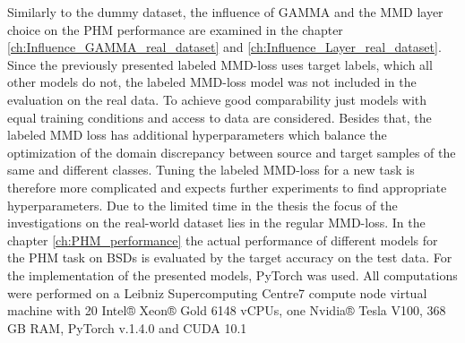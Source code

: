 Similarly to the dummy dataset, the influence of GAMMA and the MMD layer choice on the PHM performance are examined in the chapter \ref{ch:Influence_GAMMA_real_dataset} and \ref{ch:Influence_Layer_real_dataset}. Since the previously presented labeled MMD-loss uses target labels, which all other models do not, the labeled MMD-loss model was not included in the evaluation on the real data. To achieve good comparability just models with equal training conditions and access to data are considered. Besides that, the labeled MMD loss has additional hyperparameters which balance the optimization of the domain discrepancy between source and target samples of the same and different classes. Tuning the labeled MMD-loss for a new task is therefore more complicated and expects further experiments to find appropriate hyperparameters. Due to the limited time in the thesis the focus of the investigations on the real-world dataset lies in the regular MMD-loss. In the chapter \ref{ch:PHM_performance} the actual performance of different models for the PHM task on BSDs is evaluated by the target accuracy on the test data. For the implementation of the presented models, PyTorch was used.  All computations were performed on a Leibniz Supercomputing Centre7 compute node virtual machine with 20
Intel® Xeon® Gold 6148 vCPUs, one Nvidia® Tesla V100, 368 GB RAM, PyTorch v.1.4.0 and CUDA 10.1


